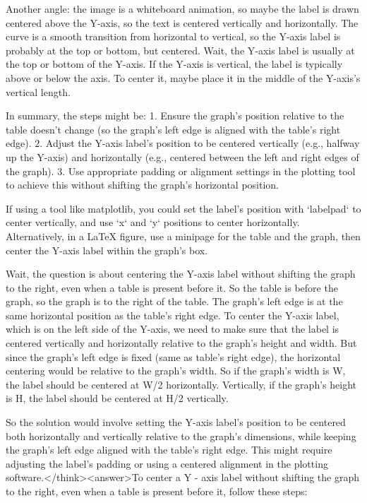 Another angle: the image is a whiteboard animation, so maybe the label is drawn centered above the Y-axis, so the text is centered vertically and horizontally. The curve is a smooth transition from horizontal to vertical, so the Y-axis label is probably at the top or bottom, but centered. Wait, the Y-axis label is usually at the top or bottom of the Y-axis. If the Y-axis is vertical, the label is typically above or below the axis. To center it, maybe place it in the middle of the Y-axis's vertical length.

In summary, the steps might be: 1. Ensure the graph's position relative to the table doesn't change (so the graph's left edge is aligned with the table's right edge). 2. Adjust the Y-axis label's position to be centered vertically (e.g., halfway up the Y-axis) and horizontally (e.g., centered between the left and right edges of the graph). 3. Use appropriate padding or alignment settings in the plotting tool to achieve this without shifting the graph's horizontal position.

If using a tool like matplotlib, you could set the label's position with `labelpad` to center vertically, and use `x` and `y` positions to center horizontally. Alternatively, in a LaTeX figure, use a minipage for the table and the graph, then center the Y-axis label within the graph's box.

Wait, the question is about centering the Y-axis label without shifting the graph to the right, even when a table is present before it. So the table is before the graph, so the graph is to the right of the table. The graph's left edge is at the same horizontal position as the table's right edge. To center the Y-axis label, which is on the left side of the Y-axis, we need to make sure that the label is centered vertically and horizontally relative to the graph's height and width. But since the graph's left edge is fixed (same as table's right edge), the horizontal centering would be relative to the graph's width. So if the graph's width is W, the label should be centered at W/2 horizontally. Vertically, if the graph's height is H, the label should be centered at H/2 vertically.

So the solution would involve setting the Y-axis label's position to be centered both horizontally and vertically relative to the graph's dimensions, while keeping the graph's left edge aligned with the table's right edge. This might require adjusting the label's padding or using a centered alignment in the plotting software.</think><answer>To center a Y - axis label without shifting the graph to the right, even when a table is present before it, follow these steps:  

